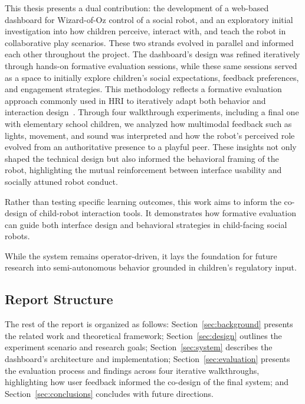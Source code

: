 \documentclass[a4paper]{usiinfbachelorproject}
\begin{document}
This thesis presents a dual contribution: the development of a web-based dashboard for Wizard-of-Oz control of a social robot, and an exploratory initial investigation into how children perceive, interact with, and teach the robot in collaborative play scenarios.
These two strands evolved in parallel and informed each other throughout the project.
The dashboard's design was refined iteratively through hands-on formative evaluation sessions, while these same sessions served as a space to initially explore children's social expectations, feedback preferences, and engagement strategies.
This methodology reflects a formative evaluation approach commonly used in HRI to iteratively adapt both behavior and interaction design~\cite{love2024teachable}.
Through four walkthrough experiments, including a final one with elementary school children, we analyzed how multimodal feedback such as lights, movement, and sound was interpreted and how the robot's perceived role evolved from an authoritative presence to a playful peer.
These insights not only shaped the technical design but also informed the behavioral framing of the robot, highlighting the mutual reinforcement between interface usability and socially attuned robot conduct.

Rather than testing specific learning outcomes, this work aims to inform the co-design of child-robot interaction tools.
It demonstrates how formative evaluation can guide both interface design and behavioral strategies in child-facing social robots.

While the system remains operator-driven, it lays the foundation for future research into semi-autonomous behavior grounded in children's regulatory input.

\subsection{\textbf{Report Structure}}
The rest of the report is organized as follows:
Section~\ref{sec:background} presents the related work and theoretical framework;
Section~\ref{sec:design} outlines the experiment scenario and research goals;
Section~\ref{sec:system} describes the dashboard's architecture and implementation;
Section~\ref{sec:evaluation} presents the evaluation process and findings across four iterative walkthroughs, highlighting how user feedback informed the co-design of the final system;
and Section~\ref{sec:conclusions} concludes with future directions.
\end{document}
